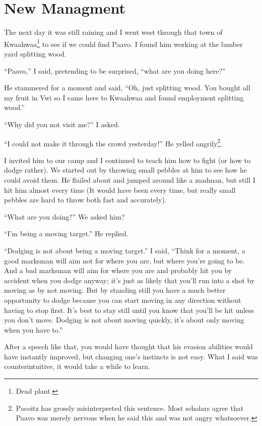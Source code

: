 \chapter{New Managment}

The next day it was still raining and I went west through that town of Kwaa\-hwaa\footnote{Dead plant.} to see if we could find Paavo. I found him working at the lumber yard splitting wood.

``Paavo,'' I said, pretending to be surprised, ``what are you doing here?''

He stammered for a moment and said, ``Oh, just splitting wood. You bought all my fruit in Vwi so I came here to Kwaa\-hwaa and found employment splitting wood.''

``Why did you not visit me?'' I asked.

``I could not make it through the crowd yesterday!'' He yelled angrily\footnote{Pacoitz has grossly misinterpreted this sentence. Most scholars agree that Paavo was merely nervous when he said this and was not angry whatsoever.}.

I invited him to our camp and I continued to teach him how to fight (or how to dodge rather).
We started out by throwing small pebbles at him to see how he could avoid them. He flailed about and jumped around like a madman, but still I hit him almost every time (It would have been every time, but really small pebbles are hard to throw both fast and accurately).

``What are you doing?'' We asked him?

``I'm being a moving target.'' He replied.

``Dodging is not about being a moving target.'' I said, ``Think for a moment, a good marksman will aim not for where you are, but where you're going to be. And a bad marksman will aim for where you are and probably hit you by accident when you dodge anyway; it's just as likely that you'll run into a shot by moving as by not moving. But by standing still you have a much better opportunity to dodge because you can start moving in any direction without having to stop first. It's best to stay still until you know that you'll be hit unless you don't move.
Dodging is not about moving quickly, it's about only moving when you have to.''

After a speech like that, you would have thought that his evasion abilities would have instantly improved, but changing one's instincts is not easy. What I said was counterintuitive, it would take a while to learn.

